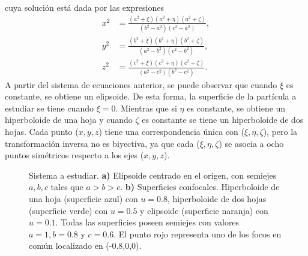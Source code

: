 \begin{center}
\end{center}
cuya solución está dada por las expresiones
\begin{align}
	x^2&=\frac{(a^2+\xi)(a^2+\eta)(a^2+\zeta)}{(b^2-a^2)(c^2-a^2)},\label{x_elips}\\
	y^2&=\frac{(b^2+\xi)(b^2+\eta)(b^2+\zeta)}{(a^2-b^2)(c^2-b^2)},\label{y_elips}\\
	z^2&=\frac{(c^2+\xi)(c^2+\eta)(c^2+\zeta)}{(a^2-c^2)(b^2-c^2)}. \label{z_elips}    
\end{align}
A partir del sistema de ecuaciones anterior, se puede observar que cuando $\xi$ es constante, se obtiene un elipsoide. De esta forma, la superficie de la partícula a estudiar se tiene cuando $\xi=0$. Mientras que si $\eta$ es constante, se obtiene un hiperboloide de una hoja y cuando $\zeta$ es constante se tiene un hiperboloide de dos hojas. Cada punto ($x,y,z$) tiene una correspondencia única con ($\xi,\eta,\zeta$), pero la transformación inversa no es biyectiva, ya que cada ($\xi,\eta,\zeta$) se asocia a ocho puntos simétricos respecto a los ejes ($x,y,z$). \cite{Cambdrige} \\

\begin{figure}[H]
	\centering
	\caption{Sistema a estudiar. \textbf{a)} Elipsoide centrado en el origen, con semiejes $a, b, c$ tales que $a > b > c.$   \textbf{b)} Superficies confocales. Hiperboloide de una hoja (superficie azul) con $u=0.8$, hiperboloide de dos hojas (superficie verde) con $u=0.5$ y elipsoide (superficie naranja) con $u=0.1$. Todas las superficies poseen semiejes con valores $a=1, b=0.8$ y $c=0.6$. El punto rojo representa uno de los focos en común localizado en (-0.8,0,0).}
	\label{ConfocalQuadrics}
\end{figure}



